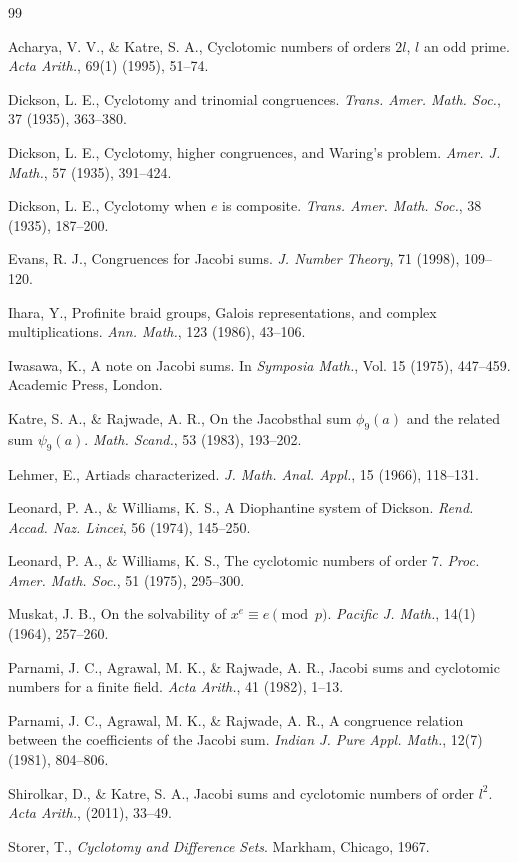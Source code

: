 \documentclass[a4paper,12pt]{article}
\begin{document}
\makeatletter
\renewcommand{\@biblabel}[1]{[#1]\hfill}
\makeatother
\begin{thebibliography}{99}



 Acharya, V. V., \& Katre, S. A., Cyclotomic numbers of orders $2l$, $l$ an odd prime. \textit{Acta Arith.}, 69(1) (1995), 51–74.

 Dickson, L. E., Cyclotomy and trinomial congruences. \textit{Trans. Amer. Math. Soc.}, 37 (1935), 363–380.

 Dickson, L. E., Cyclotomy, higher congruences, and Waring's problem. \textit{Amer. J. Math.}, 57 (1935), 391–424.

 Dickson, L. E., Cyclotomy when $e$ is composite. \textit{Trans. Amer. Math. Soc.}, 38 (1935), 187–200.

 Evans, R. J., Congruences for Jacobi sums. \textit{J. Number Theory}, 71 (1998), 109–120.

 Ihara, Y., Profinite braid groups, Galois representations, and complex multiplications. \textit{Ann. Math.}, 123 (1986), 43–106.

 Iwasawa, K., A note on Jacobi sums. In \textit{Symposia Math.}, Vol. 15 (1975), 447–459. Academic Press, London.

 Katre, S. A., \& Rajwade, A. R., On the Jacobsthal sum $\phi_{9}(a)$ and the related sum $\psi_{9}(a)$. \textit{Math. Scand.}, 53 (1983), 193–202.

 Lehmer, E., Artiads characterized. \textit{J. Math. Anal. Appl.}, 15 (1966), 118–131.

 Leonard, P. A., \& Williams, K. S., A Diophantine system of Dickson. \textit{Rend. Accad. Naz. Lincei}, 56 (1974), 145–250.

 Leonard, P. A., \& Williams, K. S., The cyclotomic numbers of order 7. \textit{Proc. Amer. Math. Soc.}, 51 (1975), 295–300.

 Muskat, J. B., On the solvability of $x^{e}\equiv e \pmod p$. \textit{Pacific J. Math.}, 14(1) (1964), 257–260.

 Parnami, J. C., Agrawal, M. K., \& Rajwade, A. R., Jacobi sums and cyclotomic numbers for a finite field. \textit{Acta Arith.}, 41 (1982), 1–13.

 Parnami, J. C., Agrawal, M. K., \& Rajwade, A. R., A congruence relation between the coefficients of the Jacobi sum. \textit{Indian J. Pure Appl. Math.}, 12(7) (1981), 804–806.

 Shirolkar, D., \& Katre, S. A., Jacobi sums and cyclotomic numbers of order $l^{2}$. \textit{Acta Arith.}, (2011), 33–49. 

 Storer, T., \textit{Cyclotomy and Difference Sets}. Markham, Chicago, 1967.
\end{thebibliography}
\end{document}
